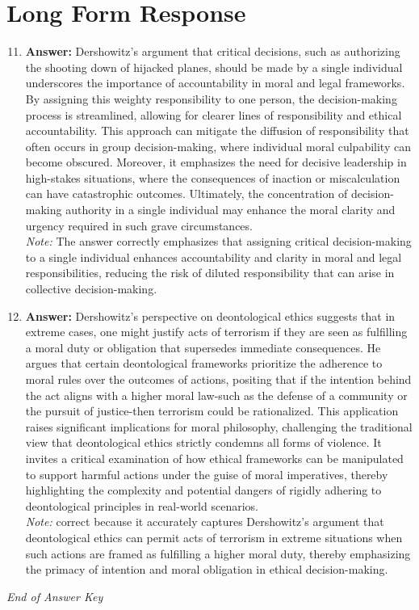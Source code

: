 \documentclass[12pt]{article}
\begin{document}
\section*{Long Form Response}
\begin{enumerate}[label=\arabic*.]
\setcounter{enumi}{10}
\item \textbf{Answer:} Dershowitz's argument that critical decisions, such as authorizing the shooting down of hijacked planes, should be made by a single individual underscores the importance of accountability in moral and legal frameworks. By assigning this weighty responsibility to one person, the decision-making process is streamlined, allowing for clearer lines of responsibility and ethical accountability. This approach can mitigate the diffusion of responsibility that often occurs in group decision-making, where individual moral culpability can become obscured. Moreover, it emphasizes the need for decisive leadership in high-stakes situations, where the consequences of inaction or miscalculation can have catastrophic outcomes. Ultimately, the concentration of decision-making authority in a single individual may enhance the moral clarity and urgency required in such grave circumstances.
\\ \textit{Note:} The answer correctly emphasizes that assigning critical decision-making to a single individual enhances accountability and clarity in moral and legal responsibilities, reducing the risk of diluted responsibility that can arise in collective decision-making.
\item \textbf{Answer:} Dershowitz's perspective on deontological ethics suggests that in extreme cases, one might justify acts of terrorism if they are seen as fulfilling a moral duty or obligation that supersedes immediate consequences. He argues that certain deontological frameworks prioritize the adherence to moral rules over the outcomes of actions, positing that if the intention behind the act aligns with a higher moral law-such as the defense of a community or the pursuit of justice-then terrorism could be rationalized. This application raises significant implications for moral philosophy, challenging the traditional view that deontological ethics strictly condemns all forms of violence. It invites a critical examination of how ethical frameworks can be manipulated to support harmful actions under the guise of moral imperatives, thereby highlighting the complexity and potential dangers of rigidly adhering to deontological principles in real-world scenarios.
\\ \textit{Note:} correct because it accurately captures Dershowitz's argument that deontological ethics can permit acts of terrorism in extreme situations when such actions are framed as fulfilling a higher moral duty, thereby emphasizing the primacy of intention and moral obligation in ethical decision-making.
\end{enumerate}

\vfill
\noindent\textit{End of Answer Key}
\end{document}
